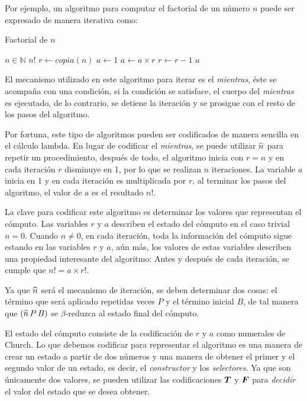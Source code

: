 Por ejemplo, un algoritmo para computar el factorial de un número \( n \) puede ser expresado de manera iterativa como:

\begin{algorithm}
  \caption{Factorial de \( n \)}
  \label{alg:factorial}
  \begin{algorithmic}
    \REQUIRE \( n \in \mathbb{N} \)
    \ENSURE \( n! \)
    \STATE \( r \leftarrow copia(n) \)
    \STATE \( a \leftarrow 1 \)
    \STATE \( a \leftarrow a \times r \)
    \STATE \( r \leftarrow r - 1 \)
    \ENDWHILE
    \RETURN \( a \)
  \end{algorithmic}
\end{algorithm}

El mecanismo utilizado en este algoritmo para iterar es el \emph{mientras}, éste se acompaña con una condición, si la condición se satisface, el cuerpo del \emph{mientras} es ejecutado, de lo contrario, se detiene la iteración y se prosigue con el resto de los pasos del algoritmo.

Por fortuna, este tipo de algoritmos pueden ser codificados de manera sencilla en el cálculo lambda. En lugar de codificar el \emph{mientras}, se puede utilizar \( \widehat{n} \) para repetir un procedimiento, después de todo, el algoritmo inicia con \( r = n \) y en cada iteración \( r \) disminuye en 1, por lo que se realizan \( n \) iteraciones. La variable \( a \) inicia en 1 y en cada iteración es multiplicada por \( r \), al terminar los pasos del algoritmo, el valor de \( a \) es el resultado \( n! \).

La clave para codificar este algoritmo es determinar los valores que representan el cómputo. Las variables \( r \) y \( a \) describen el estado del cómputo en el caso trivial \( n = 0 \). Cuando \( n \not= 0 \), en cada iteración, toda la información del cómputo sigue estando en las variables \( r \) y \( a \), aún más, los valores de estas variables describen una propiedad interesante del algoritmo: Antes y después de cada iteración, se cumple que \( n! = a \times r! \).

Ya que \( \widehat{n} \) será el mecanismo de iteración, se deben determinar dos cosas: el término que será aplicado repetidas veces \( P \) y el término inicial \( B \), de tal manera que \( (\widehat{n}\, P\, B) \) se \( β \)-reduzca al estado final del cómputo.

El estado del cómputo consiste de la codificación de \( r \) y \( a \) como numerales de Church. Lo que debemos codificar para representar el algoritmo es una manera de crear un estado a partir de dos números y una manera de obtener el primer y el segundo valor de un estado, es decir, el \emph{constructor} y los \emph{selectores}. Ya que son únicamente dos valores, se pueden utilizar las codificaciones \( \boldsymbol{T} \) y \( \boldsymbol{F} \) para \emph{decidir} el valor del estado que se desea obtener.

